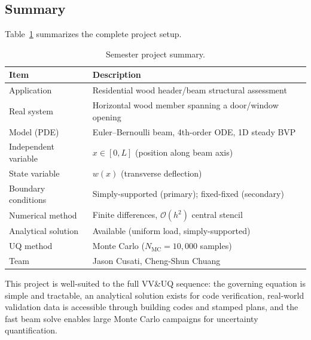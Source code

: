 \subsection{Summary}

Table~\ref{tab:project-summary} summarizes the complete project setup.

\begin{table}[ht]
\centering
\caption{Semester project summary.}
\label{tab:project-summary}
\begin{tabular}{ll}
\toprule
\textbf{Item} & \textbf{Description} \\
\midrule
Application & Residential wood header/beam structural assessment \\
Real system & Horizontal wood member spanning a door/window opening \\
Model (PDE) & Euler--Bernoulli beam, 4th-order ODE, 1D steady BVP \\
Independent variable & $x \in [0, L]$ (position along beam axis) \\
State variable & $w(x)$ (transverse deflection) \\
Boundary conditions & Simply-supported (primary); fixed-fixed (secondary) \\
Numerical method & Finite differences, $\mathcal{O}(h^2)$ central stencil \\
Analytical solution & Available (uniform load, simply-supported) \\
UQ method & Monte Carlo ($N_{\text{MC}} = 10{,}000$ samples) \\
Team & Jason Cusati, Cheng-Shun Chuang \\
\bottomrule
\end{tabular}
\end{table}

This project is well-suited to the full VV\&UQ sequence: the governing equation is simple and tractable, an analytical solution exists for code verification, real-world validation data is accessible through building codes and stamped plans, and the fast beam solve enables large Monte Carlo campaigns for uncertainty quantification.
